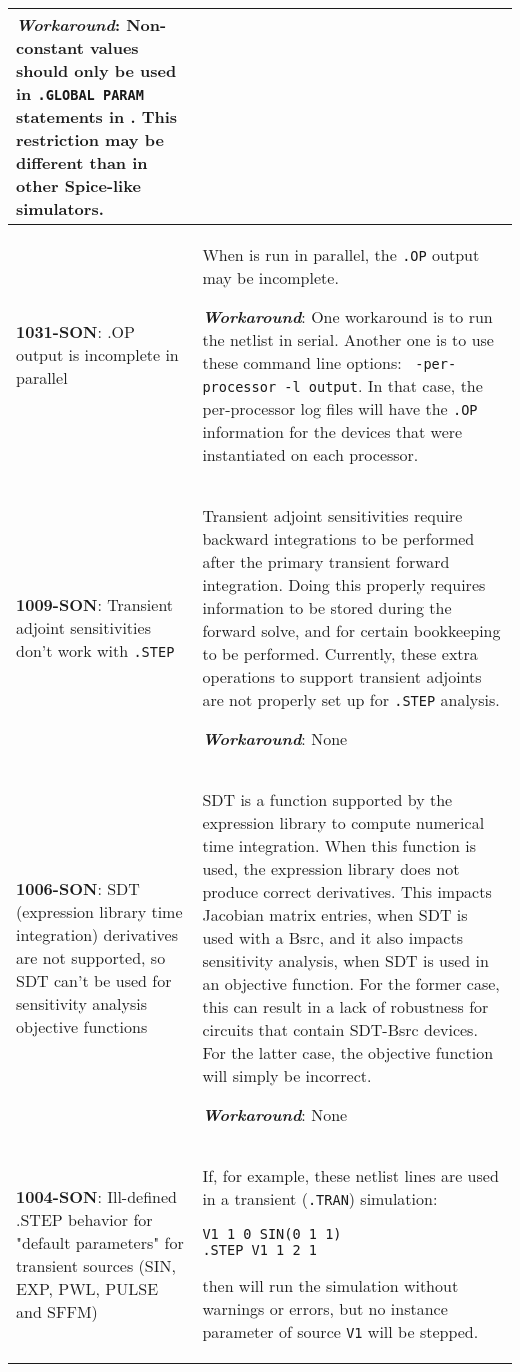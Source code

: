 {\begin{longtable}[h] {>{\raggedright\small}m{2in}|>{\raggedright\let\\\tabularnewline\small}m{3.5in}}
\textbf{\textit{Workaround}}: Non-constant values should only
be used in \texttt{.GLOBAL PARAM} statements in \Xyce{}. This
restriction may be different than in other Spice-like 
simulators.
\\ \hline

\textbf{1031-SON}: .OP output is incomplete in parallel & When \Xyce{}
is run in parallel, the \texttt{.OP} output may be incomplete. 

\textbf{\textit{Workaround}}: One workaround is to run the netlist in 
serial.  Another one is to use these command line options: \texttt{
-per-processor -l output}.  In that case, the per-processor log files 
will have the \texttt{.OP} information for the devices that were 
instantiated on each processor.
\\ \hline 

  \textbf{1009-SON}:  Transient adjoint sensitivities don't work with \texttt{.STEP}
  & Transient adjoint sensitivities require backward integrations to be performed after the primary transient forward integration.  Doing this properly requires information to be stored during the forward solve, and for certain bookkeeping to be performed.  Currently, these extra operations to support transient adjoints are not properly set up for \texttt{.STEP} analysis.

\textbf{\textit{Workaround}}: None
\\ \hline

  \textbf{1006-SON}:   SDT (expression library time integration) derivatives are not supported, so SDT can't be used for sensitivity analysis objective functions &
  SDT is a function supported by the \Xyce{} expression library to compute numerical time integration.  When this function is used, the expression library does not produce correct derivatives.  This impacts Jacobian matrix entries, when SDT is used with a Bsrc, and it also impacts sensitivity analysis, when SDT is used in an objective function.  For the former case, this can result in a lack of robustness for circuits that contain SDT-Bsrc devices.  For the latter case, the objective function will simply be incorrect.

\textbf{\textit{Workaround}}: None
\\ \hline

\textbf{1004-SON}: Ill-defined .STEP behavior for "default parameters" for 
transient sources (SIN, EXP, PWL, PULSE and SFFM) & If, for example,
these netlist lines are used in a transient (\texttt{.TRAN}) simulation:
\begin{verbatim}
V1 1 0 SIN(0 1 1)
.STEP V1 1 2 1
\end{verbatim}
then \Xyce{} will run the simulation without warnings or errors, but
no instance parameter of source \texttt{V1} will be stepped.  


\end{longtable}}
